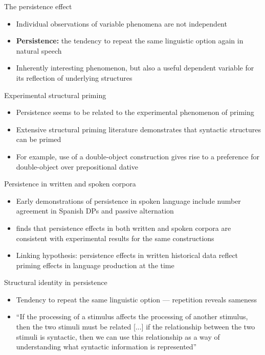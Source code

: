 \documentclass{digs-slides}
\begin{document}
\begin{frame}{The persistence effect}
	\begin{itemize}
          \item Individual observations of variable phenomena are not independent \parencite{Sankoff:1978}
		\item \textbf{Persistence:} the tendency to repeat the same linguistic option again in natural speech
		\item Inherently interesting phenomenon, but also a useful dependent variable for its reflection of underlying structures
	\end{itemize}
\end{frame}

\begin{frame}{Experimental structural priming}
	\begin{itemize}
		\item Persistence seems to be related to the experimental phenomenon of priming
		\item Extensive structural priming
                  literature \parencite[beginning with][]{Bock:1986}
                  demonstrates that syntactic structures can be primed
		\item For example, use of a double-object construction gives rise to a preference for double-object over prepositional dative
	\end{itemize}
\end{frame}

\begin{frame}{Persistence in written and spoken corpora}
	\begin{itemize}
          \item Early demonstrations of persistence in spoken language include number agreement in Spanish DPs \parencite{Poplack:1980} and passive alternation \parencite{Weiner:1983}
          \item \textcite{Gries:2005} finds that persistence effects in both written and spoken corpora are consistent with experimental results for the same constructions
		\item Linking hypothesis: persistence effects in written historical data reflect priming effects in language production at the time
	\end{itemize}
\end{frame}


\begin{frame}{Structural identity in persistence}
	\begin{itemize}
		\item Tendency to repeat the same linguistic option — repetition reveals sameness
		\item “If the processing of a stimulus affects the processing of another stimulus, then the two stimuli must be related [...] if the relationship between the two stimuli is syntactic, then we can use this relationship as a way of understanding what syntactic information is represented” \parencite[490]{Branigan:1995}
	\end{itemize}
\end{frame}
\end{document}
